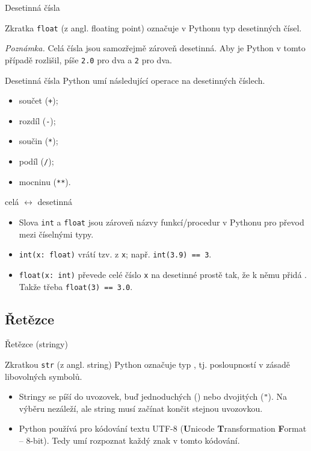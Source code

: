 \begin{frame}{Desetinná čísla}
 \begin{tcolorbox}[title=Datový typ \texttt{float}]
  Zkratka \alert{\texttt{float}} (z angl. \alert{float}ing point) označuje v
  Pythonu typ desetinných čísel.
 \end{tcolorbox}
 \pause
 \emph{Poznámka.} Celá čísla jsou samozřejmě zároveň desetinná. Aby je Python v
 tomto případě rozlišil, píše \texttt{2.0} pro  dva a
 \texttt{2} pro  dva.
\end{frame}

\begin{frame}{Desetinná čísla}
 Python umí následující operace na desetinných číslech.
 \begin{itemize}
  \item součet (\texttt{+});
  \item rozdíl (\texttt{-});
  \item součin (\texttt{*});
  \item podíl (\texttt{/});
  \item mocninu (\texttt{**}).
 \end{itemize}
\end{frame}

\begin{frame}{celá $\leftrightarrow$ desetinná} 
 \begin{itemize}
  \item<1-> Slova \texttt{int} a \texttt{float} jsou zároveň názvy
   funkcí/procedur v Pythonu pro převod mezi číselnými typy.
  \item<2-> \texttt{\alert{int}(x: float)} vrátí tzv.  z
   \texttt{x}; např. \texttt{\alert{int}(3.9) == 3}.
  \item<3-> \texttt{\alert{float}(x: int)} převede celé číslo \texttt{x} na
   desetinné prostě tak, že k němu přidá . Takže třeba
   \texttt{\alert{float}(3) == 3.0}.
 \end{itemize}
\end{frame}

\subsection[Řetězce]{Řetězce}

\begin{frame}{Řetězce (stringy)}
 \begin{tcolorbox}[title=Datový typ \texttt{str}]
  Zkratkou \alert{\texttt{str}} (z angl. \alert{str}ing) Python označuje typ
  , tj. posloupností v zásadě libovolných symbolů.
 \end{tcolorbox}
 \begin{itemize}
  \item<2-> Stringy se píší do uvozovek, buď jednoduchých
   (\texttt{\textquotesingle}) nebo dvojitých (\texttt{"}). Na výběru nezáleží,
   ale string musí začínat končit stejnou uvozovkou.
  \item<3-> Python používá pro kódování textu UTF-8 (\textbf{U}nicode
   \textbf{T}ransformation \textbf{F}ormat -- 8-bit). Tedy umí rozpoznat každý
   znak v tomto kódování.
 \end{itemize}\end{frame}

